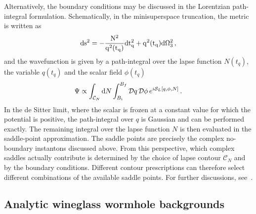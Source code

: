 \documentclass[a4paper,11pt]{article}
\begin{document}
Alternatively, the boundary conditions may be discussed in the Lorentzian path-integral formulation. Schematically, in the minisuperspace truncation, the metric is written as
\begin{equation*}
    \rm{d}s^2 = - \frac{N^2}{q^2(t_q)} \rm{d}t_q^2 + q^2(t_q) \rm{d}\Omega_3^2\,,
\end{equation*}
and the wavefunction is given by a path-integral over the lapse function $N(t_q)$, the variable $q(t_q)$ and the scalar field $\phi(t_q)$
\begin{equation*}
    \Psi
    \propto
    \int_{\mathcal{C}_N}{\rm d}N
    \int_{B_i}^{B_f}
    \mathcal{D}q\,\mathcal{D}\phi\,
    e^{i\mathcal{S}_L[q,\phi,N]}\,.
\end{equation*}
In the de Sitter limit, where the scalar is frozen at a constant value for which the potential is positive, the path-integral over $q$ is Gaussian and can be performed exactly. The remaining integral over the lapse function $N$ is then evaluated in the saddle-point approximation. The saddle points are precisely the complex no-boundary instantons discussed above. From this perspective, which complex saddles actually contribute is determined by the choice of lapse contour $\mathcal{C}_N$ and by the boundary conditions. Different contour prescriptions can therefore select different combinations of the available saddle points. For further discussions, see~\cite{PhysRevD.39.2206,Lehners:2023yrj,Vilenkin_2018,Feldbrugge:2017kzv,
Feldbrugge:2017fcc,DiazDorronsoro:2017hti}.

\subsection{Analytic wineglass wormhole backgrounds}
\end{document}
